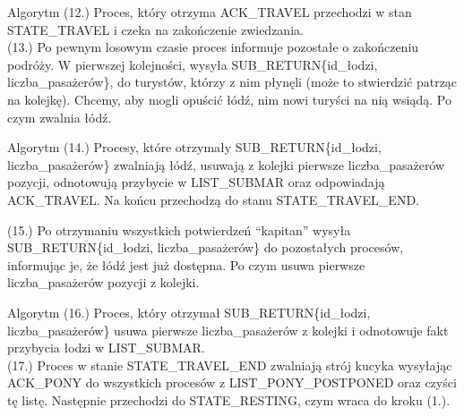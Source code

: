 \documentclass{beamer}
\begin{document}
\begin{frame}{Algorytm}
    \internallinenumbers
    (12.) Proces, który otrzyma ACK\_TRAVEL przechodzi w stan STATE\_TRAVEL i czeka na zakończenie zwiedzania. \\

    (13.) Po pewnym losowym czasie proces informuje pozostałe o zakończeniu podróży. W pierwszej kolejności, wysyła SUB\_RETURN\{id\_łodzi, liczba\_pasażerów\}, do turystów, którzy z nim płynęli (może to stwierdzić patrząc na kolejkę). Chcemy, aby mogli opuścić łódź, nim nowi turyści na nią wsiądą. Po czym zwalnia łódź.
\end{frame}

\begin{frame}{Algorytm}
    \internallinenumbers
    (14.) Procesy, które otrzymały SUB\_RETURN\{id\_łodzi, liczba\_pasażerów\} zwalniają łódź, usuwają z kolejki pierwsze liczba\_pasażerów pozycji, odnotowują przybycie w LIST\_SUBMAR oraz odpowiadają ACK\_TRAVEL. Na końcu przechodzą do stanu STATE\_TRAVEL\_END.

    (15.) Po otrzymaniu wszystkich potwierdzeń ``kapitan'' wysyła SUB\_RETURN\{id\_łodzi, liczba\_pasażerów\} do pozostałych procesów, informując je, że łódź jest już dostępna. Po czym usuwa pierwsze liczba\_pasażerów pozycji z kolejki. 
\end{frame}

\begin{frame}{Algorytm}
    \internallinenumbers
    (16.) Proces, który otrzymał SUB\_RETURN\{id\_łodzi, liczba\_pasażerów\} usuwa pierwsze liczba\_pasażerów z kolejki i odnotowuje fakt przybycia łodzi w LIST\_SUBMAR.\\
    (17.) Proces w stanie STATE\_TRAVEL\_END zwalniają strój kucyka wysyłając ACK\_PONY do wszystkich procesów z LIST\_PONY\_POSTPONED oraz czyści tę listę. Następnie przechodzi do STATE\_RESTING, czym wraca do kroku (1.).
\end{frame}
\end{document}
